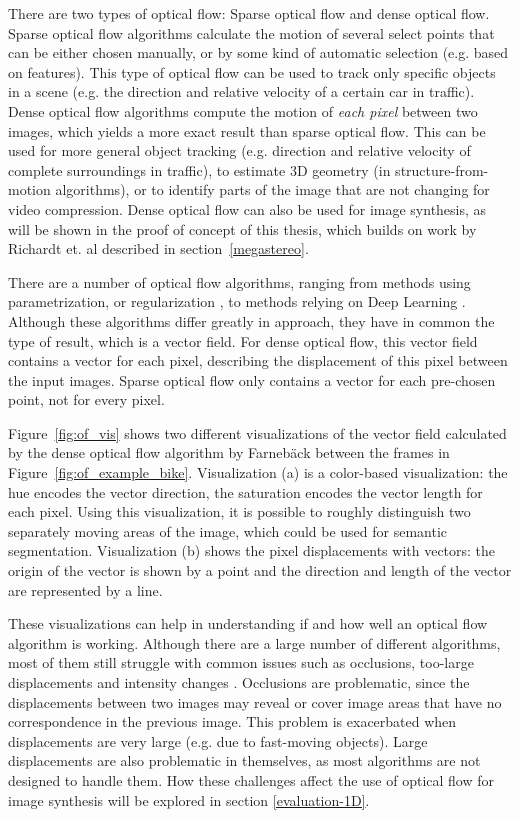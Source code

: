There are two types of optical flow: Sparse optical flow and dense optical flow. Sparse optical flow algorithms calculate the motion of several select points that can be either chosen manually, or by some kind of automatic selection (e.g. based on features). This type of optical flow can be used to track only specific objects in a scene (e.g. the direction and relative velocity of a certain car in traffic).
Dense optical flow algorithms compute the motion of \emph{each pixel} between two images, which yields a more exact result than sparse optical flow. This can be used for more general object tracking (e.g. direction and relative velocity of complete surroundings in traffic), to estimate 3D geometry (in structure-from-motion algorithms), or to identify parts of the image that are not changing for video compression. Dense optical flow can also be used for image synthesis, as will be shown in the proof of concept of this thesis, which builds on work by Richardt et. al \cite{megastereo} described in section~\ref{megastereo}.

There are a number of optical flow algorithms, ranging from methods using parametrization, or regularization \cite{of-survey}, to methods relying on Deep Learning \cite{of-deep}. Although these algorithms differ greatly in approach, they have in common the type of result, which is a vector field. For dense optical flow, this vector field contains a vector for each pixel, describing the displacement of this pixel between the input images. Sparse optical flow only contains a vector for each pre-chosen point, not for every pixel.

Figure~\ref{fig:of_vis} shows two different visualizations of the vector field calculated by the dense optical flow algorithm by Farneb\"ack \cite{farneback} between the frames in Figure~\ref{fig:of_example_bike}. Visualization (a) is a color-based visualization: the hue encodes the vector direction, the saturation encodes the vector length for each pixel. Using this visualization, it is possible to roughly distinguish two separately moving areas of the image, which could be used for semantic segmentation. Visualization (b) shows the pixel displacements with vectors: the origin of the vector is shown by a point and the direction and length of the vector are represented by a line.

These visualizations can help in understanding if and how well an optical flow algorithm is working. Although there are a large number of different algorithms, most of them still struggle with common issues such as occlusions, too-large displacements and intensity changes \cite{of-survey}. Occlusions are problematic, since the displacements between two images may reveal or cover image areas that have no correspondence in the previous image. This problem is exacerbated when displacements are very large (e.g. due to fast-moving objects). Large displacements are also problematic in themselves, as most algorithms are not designed to handle them. How these challenges affect the use of optical flow for image synthesis will be explored in section \ref{evaluation-1D}.

